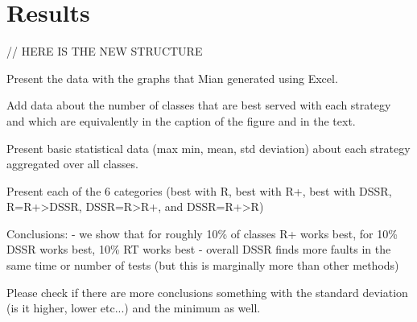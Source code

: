 \documentclass[conference]{IEEEtran}
\begin{document}

\section{Results}\label{sec:res}
// HERE IS THE NEW STRUCTURE

Present the data with the graphs that Mian generated using Excel.

Add data about the number of classes that are best served with each strategy and which are equivalently in the caption of the figure and in the text.

Present basic statistical data (max min, mean, std deviation) about each strategy aggregated over all classes.

Present each of the 6 categories (best with R, best with R+, best with DSSR, R=R+>DSSR, DSSR=R>R+, and DSSR=R+>R)

Conclusions: 
- we show that for roughly 10\% of classes R+ works best, for 10\% DSSR works best, 10\% RT works best
- overall DSSR finds more faults in the same time or number of tests (but this is marginally more than other methods)


Please check if there are more conclusions something with the standard deviation (is it higher, lower etc...) and the minimum as well.
\end{document}
